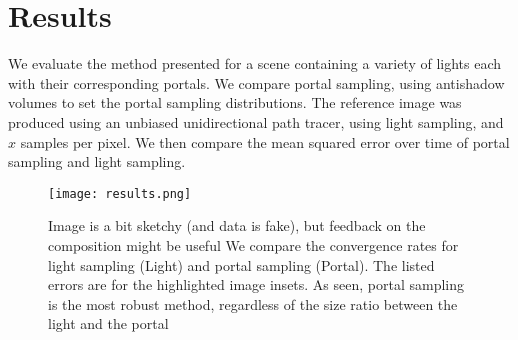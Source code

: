 \section{Results}
\label{sec:results}


We evaluate the method presented for a scene containing a variety of lights each with their corresponding portals. We compare portal sampling, using antishadow volumes to set the portal sampling distributions. The reference image was produced using an unbiased unidirectional path tracer, using light sampling, and $x$ samples per pixel. We then compare the mean squared error over time of portal sampling and light sampling.

\begin{figure*}[ht]
    \centering
    \texttt{[image: results.png]}
    \caption{{\color{red} Image is a bit sketchy (and data is fake), but feedback on the composition might be useful} We compare the convergence rates for light sampling (Light) and portal sampling (Portal). The listed errors are for the highlighted image insets. As seen, portal sampling is the most robust method, regardless of the size ratio between the light and the portal}
    \label{fig:fake-results}
\end{figure*}